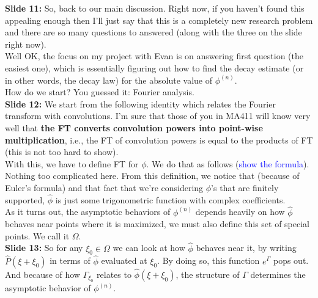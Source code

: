 \documentclass[11pt]{article}
\begin{document}
\noindent \textbf{Slide 11:} So, back to our main discussion. Right now, if you haven't found this appealing enough then I'll just say that this is a completely new research problem and there are so many questions to answered (along with the three on the slide right now). \\

Well OK, the focus on my project with Evan is on answering first question (the easiest one), which is essentially figuring out how to find the decay estimate (or in other words, the decay law) for the absolute value of $\phi^{(n)}$. \\


How do we start? You guessed it: Fourier analysis.\\



\noindent \textbf{Slide 12: } We start from the following identity which relates the Fourier transform with convolutions. I'm sure that those of you in MA411 will know very well that \textbf{the FT converts convolution powers into point-wise multiplication}, i.e., the FT of convolution powers is equal to the products of FT (this is not too hard to show). \\


With this, we have to define FT for $\phi$. We do that as follows (\textcolor{blue}{show the formula}). Nothing too complicated here. From this definition, we notice that (because of Euler's formula) and that fact that we're considering $\phi$'s that are finitely supported, $\widehat{\phi}$ is just some trigonometric function with complex coefficients. \\



As it turns out, the asymptotic behaviors of $\phi^{(n)}$ depends heavily on how $\widehat{\phi}$ behaves near points where it is maximized, we must also define this set of special points. We call it $\Omega$.\\





\noindent \textbf{Slide 13: } So for any $\xi_0 \in \Omega$ we can look at how $\widehat{\phi}$ behaves near it, by writing $\widehat{P}(\xi + \xi_0)$ in terms of $\widehat{\phi}$ evaluated at $\xi_0$. By doing so, this function $e^{\Gamma}$ pops out. And because of how $\Gamma_{\xi_0}$ relates to $\widehat{\phi}(\xi + \xi_0)$, the structure of $\Gamma$ determines the asymptotic behavior of $\phi^{(n)}$. \\
\end{document}
